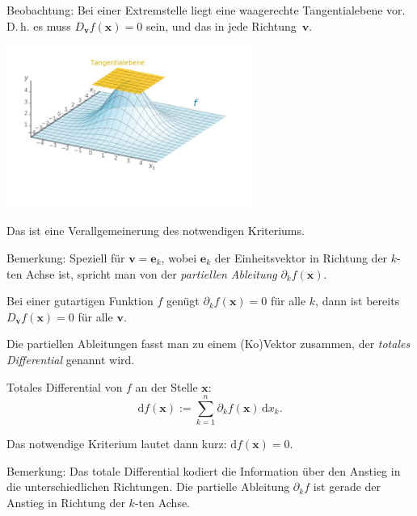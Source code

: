 \documentclass[9pt]{beamer}
\begin{document}
\begin{frame}[t]
\vspace{3em}
Beobachtung: Bei einer Extremstelle liegt eine waagerechte
Tangentialebene vor. D.\,h. es muss $D_{\mathbf v} f(\mathbf x)=0$
sein, und das in jede Richtung~$\mathbf v$.\pause

\begin{center}
\includegraphics[width=80mm]{img/Maximum2.jpg}
\end{center}
\end{frame}

\begin{frame}
Das ist eine Verallgemeinerung des notwendigen Kriteriums.
\pause

\vspace{0.8em}
Bemerkung: Speziell für $\mathbf v = \mathbf e_k$, wobei
$\mathbf e_k$ der Einheitsvektor in Richtung der $k$-ten Achse ist,
spricht man von der \emph{partiellen Ableitung}
$\partial_k f(\mathbf x)$.
\pause

\vspace{0.8em}
Bei einer gutartigen Funktion $f$ genügt
$\partial_k f(\mathbf x)=0$ für alle $k$, dann ist bereits
$D_{\mathbf v}f(\mathbf x)=0$ für alle $\mathbf v$.
\end{frame}

\begin{frame}
Die partiellen Ableitungen fasst man zu einem (Ko)Vektor zusammen,
der \emph{totales Differential} genannt wird.\pause

\begin{Definition}
Totales Differential von $f$ an der Stelle $\mathbf x$:
\[\mathrm df(\mathbf x) := \sum_{k=1}^n \partial_k f(\mathbf x)\,\mathrm dx_k.\]
\end{Definition}
\pause

Das notwendige Kriterium lautet dann kurz: $\mathrm df(\mathbf x)=0$.
\end{frame}

\begin{frame}
\begin{footnotesize}
Bemerkung: Das totale Differential kodiert die Information über den
Anstieg in die unterschiedlichen Richtungen. Die partielle
Ableitung $\partial_k f$ ist gerade der Anstieg in Richtung der
$k$-ten Achse.
\end{footnotesize}
\end{frame}
\end{document}
